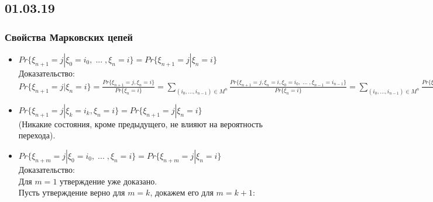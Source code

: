 \subsection{01.03.19}
\subsubsection{Свойства Марковских цепей}
\begin{itemize}
\item $Pr\{\xi_{n + 1} = j | \xi_0 = i_0, \; ... \; , \xi_n = i\} = Pr\{\xi_{n + 1} = j | \xi_n = i\}$\\
Доказательство:\\
$Pr\{\xi_{n + 1} = j | \xi_n = i\} = \frac{Pr\{\xi_{n + 1} = j, \xi_n = i\}}{Pr\{\xi_n = i\}} = \sum\limits_{(i_0, ..., i_{n-1}) \in M^n} \frac{Pr\{\xi_{n+1} = j, \xi_n = i, \xi_0 = i_0, \; ... \; , \xi_{n - 1} = i_{n - 1}\}}{Pr\{\xi_n = i\}} = \sum\limits_{(i_0, ..., i_{n-1}) \in M^n} \frac{Pr\{\xi_{n + 1} = j, \xi_n = i, \xi_0 = i_0, \; ... \; , \xi_{n - 1} = i_{n - 1}\}}{Pr\{\xi_n = i\}} = \sum\limits_{(i_0, ..., i_{n-1}) \in M^n} \frac{P_{ij}Pr\{\xi_n = i, \xi_0 = i_0, \; ... \; , \xi_{n - 1} = i_{n - 1}\}}{Pr\{\xi_n = i\}} = \frac{P_{ij}}{Pr\{\xi_n = i\}} * \sum\limits_{(i_0, ..., i_{n-1}) \in M^n}Pr\{\xi_n = i, \xi_0 = i_0, \; ... \; , \xi_{n - 1} = i_{n - 1}\} = \frac{P_{ij}}{Pr\{\xi_n = i\}} * Pr\{\xi_n = i\} = P_{ij}$\\
\item $Pr\{\xi_{n + 1} = j | \xi_k = i_k, \xi_n = i\} = Pr\{\xi_{n + 1} = j | \xi_n = i\}$\\
(Никакие состояния, кроме предыдущего, не влияют на вероятность перехода).\\
\item $Pr\{\xi_{n + m} = j | \xi_0 = i_0, \; ... \; , \xi_n = i\} = Pr\{\xi_{n + m} = j | \xi_n = i\}$\\
Доказательство:\\
Для $m = 1$ утверждение уже доказано.\\
Пусть утверждение верно для $m = k$, докажем его для $m = k + 1$:\\

\end{itemize}
